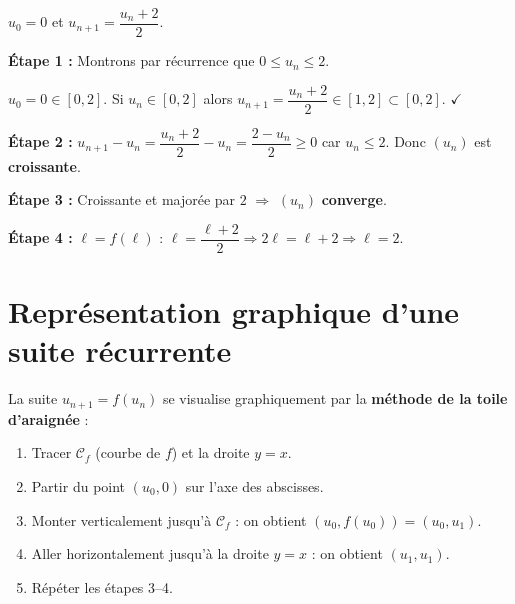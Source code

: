 \begin{exemple}
  $u_0 = 0$ et $u_{n+1} = \dfrac{u_n + 2}{2}$.

  \medskip
  \textbf{\'{E}tape 1 :} Montrons par r\'{e}currence que $0 \leq u_n \leq 2$.

  $u_0 = 0 \in [0,2]$. Si $u_n \in [0,2]$ alors
  $u_{n+1} = \dfrac{u_n+2}{2} \in [1,2] \subset [0,2]$. $\checkmark$

  \medskip
  \textbf{\'{E}tape 2 :}
  $u_{n+1} - u_n = \dfrac{u_n+2}{2} - u_n = \dfrac{2 - u_n}{2} \geq 0$
  car $u_n \leq 2$.
  Donc $(u_n)$ est \textbf{croissante}.

  \medskip
  \textbf{\'{E}tape 3 :} Croissante et major\'{e}e par $2$ $\Rightarrow$
  $(u_n)$ \textbf{converge}.

  \medskip
  \textbf{\'{E}tape 4 :} $\ell = f(\ell)$ :
  $\ell = \dfrac{\ell + 2}{2} \Rightarrow 2\ell = \ell + 2 \Rightarrow \ell = 2$.
\end{exemple}
\newpage
\section{Repr\'{e}sentation graphique d'une suite r\'{e}currente}
\begin{propriete}
  La suite $u_{n+1} = f(u_n)$ se visualise graphiquement par
  la \textbf{m\'{e}thode de la toile d'araign\'{e}e} :
  \begin{enumerate}
    \item Tracer $\mathcal{C}_f$ (courbe de $f$) et la droite $y = x$.
    \item Partir du point $(u_0, 0)$ sur l'axe des abscisses.
    \item Monter verticalement jusqu'\`{a} $\mathcal{C}_f$ :
          on obtient $(u_0, f(u_0)) = (u_0, u_1)$.
    \item Aller horizontalement jusqu'\`{a} la droite $y=x$ :
          on obtient $(u_1, u_1)$.
    \item R\'{e}p\'{e}ter les \'{e}tapes 3--4.
  \end{enumerate}
\end{propriete}

